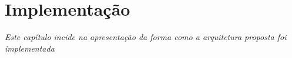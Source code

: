 
\chapter{Implementação}
\label{cap:5}
\emph{Este capítulo incide na apresentação da forma como a arquitetura proposta foi implementada}